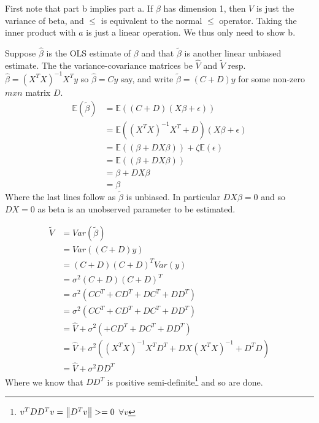 First note that part b implies part a. If $\beta$ has dimension 1, then $V$ is just the variance of beta, and $\leq$ is equivalent to the normal $\leq$ operator. Taking the inner product with $a$ is just a linear operation. We thus only need to show b.


Suppose $\hat{\beta}$ is the OLS estimate of $\beta$ and that $\tilde{\beta}$ is another linear unbiased estimate. The the variance-covariance matrices be $\hat{V}$ and $\tilde{V}$ resp.
$\hat{\beta} = \left(X^T X\right)^{-1} X^T y$ so $\hat{\beta} = C y$ say, and write $\tilde{\beta} = (C + D) y $ for some non-zero $m x n$ matrix $D$.
\begin{align*}
    \mathbb{E}\left(\tilde{\beta}\right) &= \mathbb{E}\left(\left(C + D\right) \left(X\beta + \epsilon\right) \right) \\
    &= \mathbb{E} \left(\left(X^T X\right)^{-1} X^T + D\right) \left(X\beta + \epsilon\right)  \\
    &= \mathbb{E}\left(\left(\beta + DX\beta \right) \right) + \zeta \mathbb{E}(\epsilon) \\
    &= \mathbb{E}\left(\left(\beta + DX\beta \right) \right) \\
    &= \beta + DX\beta \\
    &= \beta
\end{align*}
Where the last lines follow as $\tilde{\beta}$ is unbiased. In particular $DX\beta = 0$ and so $DX = 0$ as beta is an unobserved parameter to be estimated.

\begin{align*}
    \tilde{V} &= Var\left(\tilde{\beta}\right)\\
    &= Var\left(\left(C + D\right) y \right) \\
    &= \left(C + D\right) \left(C + D\right)^T Var\left( y \right) \\
    &= \sigma^2 \left(C + D\right) \left(C + D\right)^T\\
    &= \sigma^2 \left( C C^T + C D^T  + D C^T + D D^T\right)\\
    &= \sigma^2 \left(C C^T  + C D^T  + D C^T + D D^T\right)\\
    &= \hat{V} + \sigma^2 \left(+ C D^T  + D C^T + D D^T\right) \\
    &= \hat{V} + \sigma^2 \left(\left(X^T X\right)^{-1}X^T D^T  +   D X \left(X^T X\right)^{-1} + D^T D\right) \\
    &= \hat{V} + \sigma^2 D D^T
\end{align*}
Where we know that $D D^T$ is positive semi-definite\footnote{$v^T D D^T v = \left\lVert D^T v\right\rVert >= 0$ $ \forall v $} and so are done.



